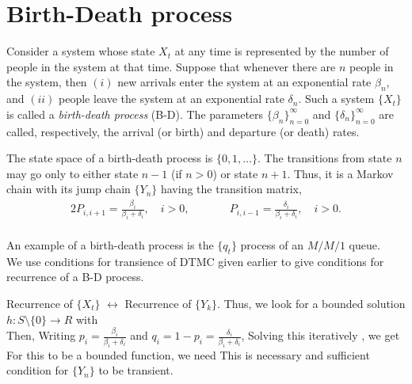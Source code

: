 \documentclass[all-lectures.tex]{subfiles}
\begin{document}

\setcounter{section}{5}
\setcounter{subsection}{0}

\section*{}

\section{Birth-Death process}
Consider a system whose state $X_t$ at any time is represented by the number of people
in the system at that time. 
Suppose that whenever there are $n$ people in the system,
then $(i)$ new arrivals enter the system at an exponential rate $\beta_n$, and $(ii)$ people
leave the system at an exponential rate $\delta_n$. 
Such a system $\{X_t\}$ is called a \textit{birth-death process} (B-D). The parameters $\{\beta_n\}^{\infty}_{n=0}$ and $\{\delta_n\}^{\infty}_{n=0}$ are called, respectively, the
arrival (or birth) and departure (or death) rates.

The state space of a birth-death process is $\{0,1, \dots\}$.
The transitions from state $n$ may go only to either state $n-1$ (if $n>0$) or
state $n + 1$. 
Thus, it is a Markov chain with its jump chain $\{Y_n\}$ having the transition matrix,
\begin{alignat*}{2}
P_{i,i+1} = \frac{\beta_i}{\beta_i+\delta_i}, \quad i>0, && \quad  \quad  P_{i,i-1} = \frac{\delta_i}{\beta_i+\delta_i},  \quad i>0.
\end{alignat*}
\\

An example of a birth-death process is the $\{q_t\}$ process of an $M/M/1$ queue. \\
We use conditions for transience of DTMC given earlier to give conditions for recurrence of a B-D process.

Recurrence of $\{X_t\}$ $\leftrightarrow $ Recurrence of $\{Y_k\}$.
Thus, we look for a bounded solution $h:S\setminus\{0\} \to R$ with
\\
Then,
Writing $p_i = \frac{\beta_i}{\beta_i + \delta_i}$ and $q_i=1-p_i = \frac{\delta_i}{\beta_i + \delta_i}$,
Solving this iteratively , we get
For this to be a bounded function, we need
This is necessary and sufficient condition for $\{Y_n\}$ to be transient.
\end{document}
